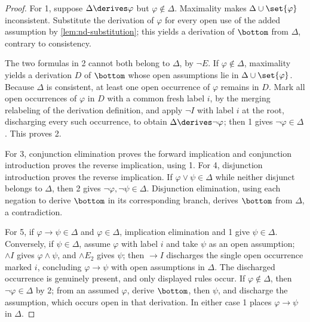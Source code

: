 \begin{proof}
For 1, suppose \(\Delta\derives\varphi\) but \(\varphi\notin\Delta\).
Maximality makes \(\Delta\cup\set{\varphi}\) inconsistent.  Substitute the
derivation of \(\varphi\) for every open use of the added assumption by
\cref{lem:nd-substitution}; this yields a derivation of \(\bottom\) from
\(\Delta\), contrary to consistency.

The two formulas in 2 cannot both belong to \(\Delta\), by \(\neg E\).  If
\(\varphi\notin\Delta\), maximality yields a derivation \(D\) of
\(\bottom\) whose open assumptions lie in \(\Delta\cup\set{\varphi}\).
Because \(\Delta\) is consistent, at least one open occurrence of
\(\varphi\) remains in \(D\).  Mark all open occurrences of \(\varphi\) in
\(D\) with a common fresh label \(i\), by the merging relabeling of the
derivation definition, and apply \(\neg I\) with label \(i\) at the root,
discharging every such occurrence, to obtain
\(\Delta\derives\neg\varphi\); then 1 gives \(\neg\varphi\in\Delta\).
This proves 2.

For 3, conjunction elimination proves the forward implication and conjunction
introduction proves the reverse implication, using 1.  For 4, disjunction
introduction proves the reverse implication.  If
\(\varphi\lor\psi\in\Delta\) while neither disjunct belongs to \(\Delta\),
then 2 gives \(\neg\varphi,\neg\psi\in\Delta\).  Disjunction elimination,
using each negation to derive \(\bottom\) in its corresponding branch, derives
\(\bottom\) from \(\Delta\), a contradiction.

For 5, if \(\varphi\to\psi\in\Delta\) and \(\varphi\in\Delta\), implication
elimination and 1 give \(\psi\in\Delta\).  Conversely, if
\(\psi\in\Delta\), assume \(\varphi\) with label \(i\) and take \(\psi\)
as an open assumption; \(\land I\) gives \(\varphi\land\psi\), and
\(\land E_2\) gives \(\psi\); then \(\to I\) discharges the single open
occurrence marked \(i\), concluding \(\varphi\to\psi\) with open
assumptions in \(\Delta\).  The discharged occurrence is genuinely
present, and only displayed rules occur.  If \(\varphi\notin\Delta\), then
\(\neg\varphi\in\Delta\) by 2; from an assumed \(\varphi\), derive
\(\bottom\), then \(\psi\), and discharge the assumption, which occurs
open in that derivation.  In either case 1
places \(\varphi\to\psi\) in \(\Delta\).
\end{proof}

